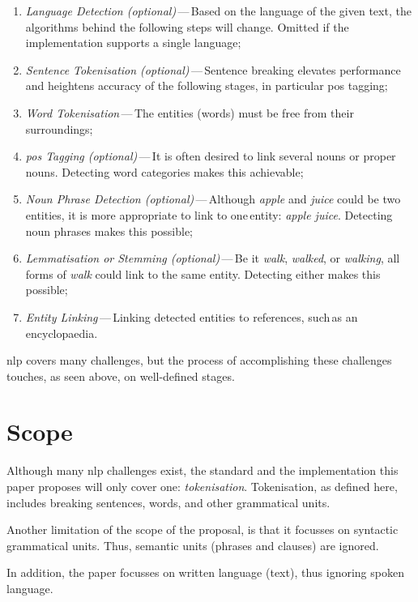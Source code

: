 \begin{enumerate}
\item\emph{Language Detection (optional)}\,---\,Based on the language of the
    given text, the algorithms behind the following steps will change.
  Omitted if the implementation supports a single language;
\item\emph{Sentence Tokenisation (optional)}\,---\,Sentence breaking elevates
    performance and heightens accuracy of the following stages, in
    particular \acrshort{pos} tagging;
\item\emph{Word Tokenisation}\,---\,The entities (words) must be free from
  their surroundings;
\item\emph{\gls{pos} Tagging (optional)}\,---\,It is often desired to link
    several nouns or proper nouns.
  Detecting word categories makes this achievable;
\item\emph{Noun Phrase Detection (optional)}\,---\,Although \emph{apple} and
    \emph{juice} could be two\,entities, it is more appropriate to link to
    one\,entity: \emph{apple juice}.
  Detecting noun phrases makes this possible;
\item\emph{Lemmatisation or Stemming (optional)}\,---\,Be it \emph{walk},
    \emph{walked}, or \emph{walking}, all forms of \emph{walk} could link
    to the same entity.
  Detecting either makes this possible;
\item\emph{Entity Linking}\,---\,Linking detected entities to references,
  such\,as an encyclopaedia.
\end{enumerate}

\noindent \gls{nlp} covers many challenges, but the process of accomplishing
  these challenges touches, as seen above, on well-defined stages.

\section{Scope}\label{scope}

Although many \gls{nlp} challenges exist, the standard and the implementation
  this paper proposes will only cover one: \emph{tokenisation}.
Tokenisation, as defined here, includes breaking sentences, words, and
other grammatical units.

Another limitation of the scope of the proposal, is that it focusses on
  syntactic grammatical units.
Thus, semantic units (phrases and clauses) are ignored.

In addition, the paper focusses on written language (text), thus ignoring
  spoken language.

